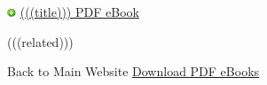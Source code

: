 \documentclass{article}
\begin{document}
\begin{center}
  \includegraphics[width=0.02\textwidth]{download.png}
  \href{http://(((domain)))/download/(((title|replace(' ', '-')))).pdf}{(((title))) PDF eBook}
\end{center}

\begin{center}
\end{center}

\clearpage

(((related)))

\noindent Back to Main Website \href{http://(((domain)))}{Download PDF eBooks}
\end{document}
